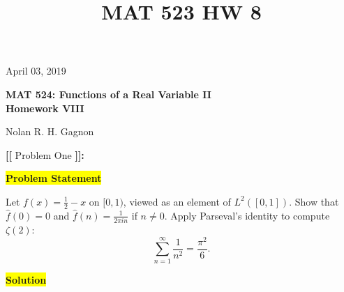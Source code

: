 \documentclass[12pt]{article}
\title{MAT 523 HW 8}
\newcommand{\mybox}{%
    \collectbox{%
        \setlength{\fboxsep}{2pt}%
        \fbox{\BOXCONTENT}%
    }%
}
\begin{document}
\hfill April 03, 2019
\begin{center}
\begin{large}
\textbf{MAT 524: Functions of a Real Variable II \\
\vspace{-5mm}
Homework VIII \\}
\end{large}
\vspace{-2mm}
Nolan R. H. Gagnon \\
\end{center}
\vspace{-0.5cm}
\noindent \textbf{{\huge [}{\Large [}} Problem One \textbf{{\Large ]}{\huge ]}}{\Large \textbf{:}}

\vspace{3mm}

\noindent\mybox{\colorbox{yellow}{\textbf{Problem Statement}}}\hspace{3mm}\hrulefill

\noindent Let $f(x) = \frac{1}{2} - x$ on $[0,1)$, viewed as an element of $L^2([0,1])$. Show that $\hat{f}(0)=0$ and $\hat{f}(n) = \frac{1}{2\pi i n}$ if $n\neq 0$. Apply Parseval's identity to compute $\zeta(2)$: 
$$\sum\limits_{n = 1}^{\infty} \frac{1}{n^2}= \frac{\pi^2}{6}.$$

\noindent\mybox{\colorbox{yellow}{\textbf{Solution}}}\hspace{3mm}\hrulefill
\end{document}
